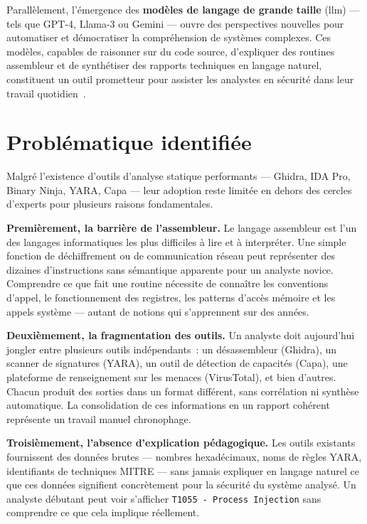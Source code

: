 Parallèlement, l'émergence des \textbf{modèles de langage de grande taille} (\acrfull{llm}) --- tels que GPT-4, Llama-3 ou Gemini --- ouvre des perspectives nouvelles pour automatiser et démocratiser la compréhension de systèmes complexes. Ces modèles, capables de raisonner sur du code source, d'expliquer des routines assembleur et de synthétiser des rapports techniques en langage naturel, constituent un outil prometteur pour assister les analystes en sécurité dans leur travail quotidien~\cite{llm_malware_2023}.

\section*{Problématique identifiée}

Malgré l'existence d'outils d'analyse statique performants --- Ghidra, IDA Pro, Binary Ninja, YARA, Capa --- leur adoption reste limitée en dehors des cercles d'experts pour plusieurs raisons fondamentales.

\textbf{Premièrement, la barrière de l'assembleur.} Le langage assembleur est l'un des langages informatiques les plus difficiles à lire et à interpréter. Une simple fonction de déchiffrement ou de communication réseau peut représenter des dizaines d'instructions sans sémantique apparente pour un analyste novice. Comprendre ce que fait une routine nécessite de connaître les conventions d'appel, le fonctionnement des registres, les patterns d'accès mémoire et les appels système --- autant de notions qui s'apprennent sur des années.

\textbf{Deuxièmement, la fragmentation des outils.} Un analyste doit aujourd'hui jongler entre plusieurs outils indépendants~: un désassembleur (Ghidra), un scanner de signatures (YARA), un outil de détection de capacités (Capa), une plateforme de renseignement sur les menaces (VirusTotal), et bien d'autres. Chacun produit des sorties dans un format différent, sans corrélation ni synthèse automatique. La consolidation de ces informations en un rapport cohérent représente un travail manuel chronophage.

\textbf{Troisièmement, l'absence d'explication pédagogique.} Les outils existants fournissent des données brutes --- nombres hexadécimaux, noms de règles YARA, identifiants de techniques MITRE --- sans jamais expliquer en langage naturel ce que ces données signifient concrètement pour la sécurité du système analysé. Un analyste débutant peut voir s'afficher \texttt{T1055 - Process Injection} sans comprendre ce que cela implique réellement.

